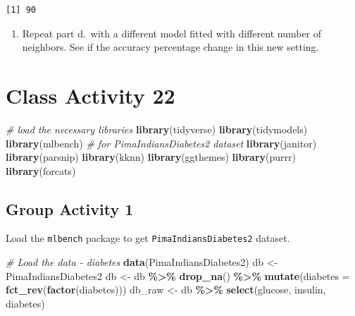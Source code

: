 \documentclass[
]{book}
\newenvironment{Shaded}{\begin{snugshade}}{\end{snugshade}}
\newcommand{\AttributeTok}[1]{\textcolor[rgb]{0.13,0.29,0.53}{#1}}
\newcommand{\CommentTok}[1]{\textcolor[rgb]{0.56,0.35,0.01}{\textit{#1}}}
\newcommand{\FunctionTok}[1]{\textcolor[rgb]{0.13,0.29,0.53}{\textbf{#1}}}
\newcommand{\NormalTok}[1]{#1}
\newcommand{\OtherTok}[1]{\textcolor[rgb]{0.56,0.35,0.01}{#1}}
\newcommand{\SpecialCharTok}[1]{\textcolor[rgb]{0.81,0.36,0.00}{\textbf{#1}}}
\providecommand{\tightlist}{%
  \setlength{\itemsep}{0pt}\setlength{\parskip}{0pt}}
\begin{document}
\begin{verbatim}
[1] 90
\end{verbatim}

\begin{enumerate}
\def\labelenumi{\alph{enumi}.}
\setcounter{enumi}{4}
\tightlist
\item
  Repeat part d.~with a different model fitted with different number of neighbors. See if the accuracy percentage change in this new setting.
\end{enumerate}

\hypertarget{class-activity-22}{%
\chapter{Class Activity 22}\label{class-activity-22}}

\begin{Shaded}
\begin{Highlighting}[]
\CommentTok{\# load the necessary libraries}
\FunctionTok{library}\NormalTok{(tidyverse) }
\FunctionTok{library}\NormalTok{(tidymodels)}
\FunctionTok{library}\NormalTok{(mlbench)     }\CommentTok{\# for PimaIndiansDiabetes2 dataset}
\FunctionTok{library}\NormalTok{(janitor)}
\FunctionTok{library}\NormalTok{(parsnip)}
\FunctionTok{library}\NormalTok{(kknn)}
\FunctionTok{library}\NormalTok{(ggthemes)}
\FunctionTok{library}\NormalTok{(purrr)}
\FunctionTok{library}\NormalTok{(forcats)}
\end{Highlighting}
\end{Shaded}

\hypertarget{group-activity-1-7}{%
\section{Group Activity 1}\label{group-activity-1-7}}

Load the \texttt{mlbench} package to get \texttt{PimaIndiansDiabetes2} dataset.

\begin{Shaded}
\begin{Highlighting}[]
\CommentTok{\# Load the data {-} diabetes}
\FunctionTok{data}\NormalTok{(PimaIndiansDiabetes2)}
\NormalTok{db }\OtherTok{\textless{}{-}}\NormalTok{ PimaIndiansDiabetes2}
\NormalTok{db }\OtherTok{\textless{}{-}}\NormalTok{ db }\SpecialCharTok{\%\textgreater{}\%} \FunctionTok{drop\_na}\NormalTok{() }\SpecialCharTok{\%\textgreater{}\%} \FunctionTok{mutate}\NormalTok{(}\AttributeTok{diabetes =} \FunctionTok{fct\_rev}\NormalTok{(}\FunctionTok{factor}\NormalTok{(diabetes))) }
\NormalTok{db\_raw }\OtherTok{\textless{}{-}}\NormalTok{ db }\SpecialCharTok{\%\textgreater{}\%} \FunctionTok{select}\NormalTok{(glucose, insulin, diabetes)}
\end{Highlighting}
\end{Shaded}
\end{document}
